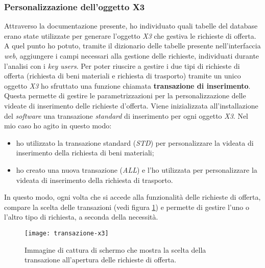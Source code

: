 \subsubsection{Personalizzazione dell'oggetto X3}
Attraverso la documentazione presente, ho individuato quali tabelle del database erano state utilizzate per generare l'oggetto \textit{X3} che gestiva le richieste di offerta.
A quel punto ho potuto, tramite il dizionario delle tabelle presente nell'interfaccia \textit{web}, aggiungere i campi necessari alla gestione delle richieste, individuati durante l'analisi con i \textit{key users}.
Per poter riuscire a gestire i due tipi di richieste di offerta (richiesta di beni materiali e richiesta di trasporto) tramite un unico oggetto \textit{X3} ho sfruttato una funzione chiamata \textbf{transazione di inserimento}.
Questa permette di gestire le parametrizzazioni per la personalizzazione delle videate di inserimento delle richieste d'offerta.
Viene inizializzata all'installazione del \textit{software} una transazione \textit{standard} di inserimento per ogni oggetto \textit{X3}. 
Nel mio caso ho agito in questo modo:
\begin{itemize}
	\item ho utilizzato la transazione standard (\textit{STD}) per personalizzare la videata di inserimento della richiesta di beni materiali;
	\item ho creato una nuova transazione (\textit{ALL}) e l'ho utilizzata per personalizzare la videata di inserimento della richiesta di trasporto.
\end{itemize}
In questo modo, ogni volta che si accede alla funzionalità delle richieste di offerta, compare la scelta delle transazioni (vedi figura \ref{fig:transazione}) e permette di gestire l'uno o l'altro tipo di richiesta, a seconda della necessità.

\begin{figure}[htbp]
	\begin{center}
		\texttt{[image: transazione-x3]}
		\caption{Immagine di cattura di schermo che mostra la scelta della transazione all'apertura delle richieste di offerta.}
		\label{fig:transazione}
	\end{center}
\end{figure}

